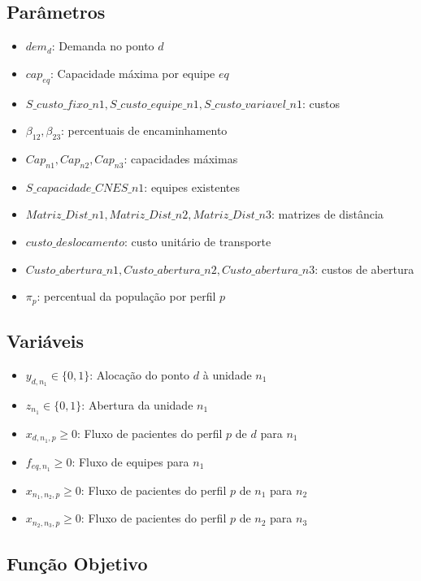 \documentclass{article}
\begin{document}
\subsection{Parâmetros}

\begin{itemize}
    \item $dem_d$: Demanda no ponto $d$
    \item $cap_{eq}$: Capacidade máxima por equipe $eq$
    \item $S\_custo\_fixo\_n1, S\_custo\_equipe\_n1, S\_custo\_variavel\_n1$: custos
    \item $\beta_{12}, \beta_{23}$: percentuais de encaminhamento
    \item $Cap_{n1}, Cap_{n2}, Cap_{n3}$: capacidades máximas
    \item $S\_capacidade\_CNES\_n1$: equipes existentes
    \item $Matriz\_Dist\_n1, Matriz\_Dist\_n2, Matriz\_Dist\_n3$: matrizes de distância
    \item $custo\_deslocamento$: custo unitário de transporte
    \item $Custo\_abertura\_n1, Custo\_abertura\_n2, Custo\_abertura\_n3$: custos de abertura
    \item $\pi_p$: percentual da população por perfil $p$
\end{itemize}

\subsection{Variáveis}

\begin{itemize}
    \item $y_{d,n_1} \in \{0,1\}$: Alocação do ponto $d$ à unidade $n_1$
    \item $z_{n_1} \in \{0,1\}$: Abertura da unidade $n_1$
    \item $x_{d,n_1,p} \geq 0$: Fluxo de pacientes do perfil $p$ de $d$ para $n_1$
    \item $f_{eq,n_1} \geq 0$: Fluxo de equipes para $n_1$
    \item $x_{n_1,n_2,p} \geq 0$: Fluxo de pacientes do perfil $p$ de $n_1$ para $n_2$
    \item $x_{n_2,n_3,p} \geq 0$: Fluxo de pacientes do perfil $p$ de $n_2$ para $n_3$
\end{itemize}

\subsection{Função Objetivo}
\end{document}
